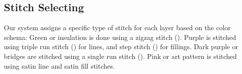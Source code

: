 \subsection{Stitch Selecting}
Our system assigns a specific type of stitch for each layer based on the color schema: Green or insulation is done using a zigzag stitch (). Purple is stitched using triple run stitch () for lines, and step stitch () for fillings. Dark purple or bridges are stitched using a single run stitch (). Pink or art pattern is stitched using satin line and satin fill stitches.










